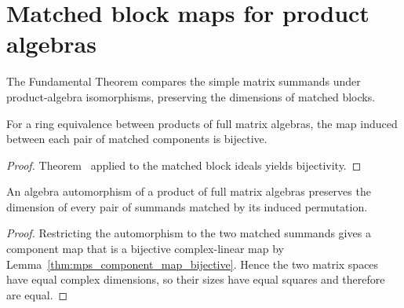 \section{Matched block maps for product algebras}

The Fundamental Theorem compares the simple matrix summands under
product-algebra isomorphisms, preserving the dimensions of matched blocks.

\begin{lemma}
    \label{thm:mps_component_map_bijective}
    \leanok

    For a ring equivalence between products of full matrix algebras, the map
    induced between each pair of matched components is bijective.
\end{lemma}

\begin{proof}\leanok

    Theorem~\cite[``Paired component maps are bijections'']{QICLean2026Blueprint}
    applied to the matched block ideals yields bijectivity.
\end{proof}

\begin{lemma}
    \label{thm:mps_dim_preserved}
    \leanok
    An algebra automorphism of a product of full matrix algebras preserves
    the dimension of every pair of summands matched by its induced
    permutation.
\end{lemma}

\begin{proof}\leanok
    Restricting the automorphism to the two matched summands gives a
    component map that is a bijective complex-linear map by
    Lemma~\ref{thm:mps_component_map_bijective}. Hence the two matrix
    spaces have equal complex dimensions, so their sizes have equal squares
    and therefore are equal.
\end{proof}
